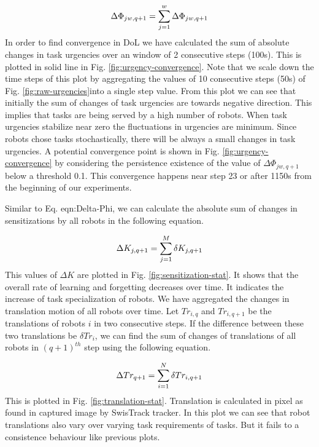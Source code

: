 \documentclass{llncs}
\begin{document}
\begin{equation}
\small
\Delta \Phi_{jw, q+1} = \sum_{j=1}^{w}  \Delta \Phi_{jw, q+1} 
\end{equation}
In order to find convergence in DoL we have calculated  the sum of absolute changes in task urgencies over an window of 2 consecutive steps (100s). This is plotted in solid line in Fig. \ref{fig:urgency-convergence}.  Note that we scale down the time steps of this plot by aggregating the values of 10 consecutive steps (50s) of  Fig. \ref{fig:raw-urgencies}into a single step value.
From this plot we can see that  initially the sum of changes of task urgencies are towards negative direction. This implies that tasks are being served by a high number of robots. When task urgencies stabilize near zero the fluctuations in urgencies are minimum. Since robots chose tasks stochastically,  there will be always a small changes in task urgencies. A potential convergence point is shown in   Fig. \ref{fig:urgency-convergence} by considering the persistence existence of the value of $\Delta \Phi_{jw, q+1}$ below a threshold 0.1. This convergence happens near step 23 or after 1150s from the beginning of our experiments.

Similar to Eq. {eqn:Delta-Phi}, we can calculate the absolute sum of changes in sensitizations  by all robots in the following equation.
  
\begin{equation}
\small 
\Delta K_{j, q+1} = \sum_{j=1}^{M} \delta K_{j, q+1} 
\label{eqn:Delta-K}
\end{equation}
This values of $\Delta K$ are plotted in Fig. \ref{fig:sensitization-stat}. It shows that the overall rate of learning and forgetting decreases over time. It indicates the increase of task specialization of robots.
We have aggregated the changes in translation motion of all robots over time.  Let $Tr_{i,q}$ and  $Tr_{i,q+1}$ be the translations of robots $i$ in two consecutive steps. If the difference between these two translations be $\delta Tr_{i}$, we can find the sum of changes of translations of all robots in $(q+1)^{th}$ step using the following equation.

\begin{equation}
\small 
\Delta Tr_{q+1} = \sum_{i=1}^{N} \delta Tr_{i, q+1} 
\label{eqn:Delta-Tr}
\end{equation}
This is plotted in Fig. \ref{fig:translation-stat}. Translation is calculated in pixel as found in captured image by SwisTrack tracker. In this plot we can see that robot translations also vary over varying task requirements of tasks. But it fails to a consistence behaviour like previous plots.
\end{document}
